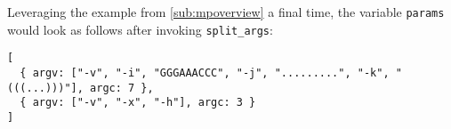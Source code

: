 \documentclass[11pt]{article}
\begin{document}
Leveraging the example from \ref{sub:mpoverview} a final time, the variable {\tt params} would look as follows after invoking {\tt split\_args}:

\begin{verbatim}
[
  { argv: ["-v", "-i", "GGGAAACCC", "-j", ".........", "-k", "(((...)))"], argc: 7 },
  { argv: ["-v", "-x", "-h"], argc: 3 }
]
\end{verbatim}








\end{document}
